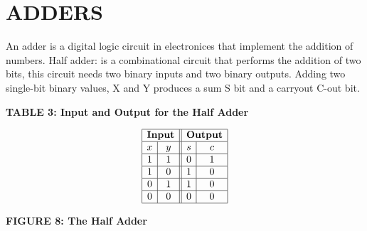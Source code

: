 
\section{ADDERS}

An adder is a digital logic circuit in electronices that implement the addition of numbers.
Half adder: is a combinational circuit that performs the addition of two bits, this circuit needs two binary inputs and two binary outputs.
Adding two single-bit binary values, X and Y produces a sum S bit and a carryout C-out bit.





\textbf{TABLE 3: Input and Output for the Half Adder}

\[
\begin{array}{|c|c||c|c|}
\hline
\multicolumn{2}{|c||}{\textbf{Input}} & \multicolumn{2}{c|}{\textbf{Output}} \\
\hline
x & y & s & c \\
\hline
1 & 1 & 0 & 1 \\
\hline
1 & 0 & 1 & 0 \\
\hline
0 & 1 & 1 & 0 \\
\hline
0 & 0 & 0 & 0 \\
\hline
\end{array}
\]

\vspace{0.5cm}


\textbf{FIGURE 8: The Half Adder}
